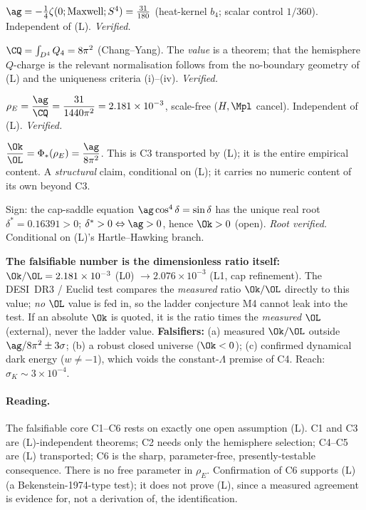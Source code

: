 \begin{description}[leftmargin=2.8em,itemsep=3pt]
\item[C1 {[THM]}]
  $\ag=-\tfrac14\zeta(0;\text{Maxwell};S^4)=\tfrac{31}{180}$ (heat-kernel
  $b_4$; scalar control $1/360$). Independent of (L). \emph{Verified.}
\item[C2 {[THM\,$|$\,H]}]
  $\CQ=\int_{D^4}Q_4=8\pi^2$ (Chang--Yang). The \emph{value} is a theorem;
  that the hemisphere $Q$-charge is the relevant normalisation follows from
  the no-boundary geometry of (L) and the uniqueness criteria (i)--(iv).
  \emph{Verified.}
\item[C3 {[THM]}]
  $\displaystyle \rho_E=\frac{\ag}{\CQ}=\frac{31}{1440\pi^2}=2.181\times10^{-3}$,
  scale-free ($H,\Mpl$ cancel). Independent of (L). \emph{Verified.}
\item[C4 {[STRUCT\,$|$\,(L)]}]
  $\displaystyle \frac{\Ok}{\OL}=\Phi_*(\rho_E)=\frac{\ag}{8\pi^2}$.
  This is C3 transported by (L); it is the entire empirical content. A
  \emph{structural} claim, conditional on (L); it carries no numeric content
  of its own beyond C3.
\item[C5 {[DER\,$|$\,(L), cap saddle]}]
  Sign: the cap-saddle equation $\ag\cos^4\delta=\sin\delta$ has the unique
  real root $\delta^*=0.16391>0$; $\delta^*>0\Leftrightarrow\ag>0$, hence
  $\Ok>0$ (open). \emph{Root verified.} Conditional on (L)'s Hartle--Hawking
  branch.
\item[C6 {[FALS]}]
  \textbf{The falsifiable number is the dimensionless ratio itself:}
  $\Ok/\OL = 2.181\times10^{-3}$ (L0) $\to 2.076\times10^{-3}$ (L1, cap
  refinement). The DESI~DR3 / Euclid test compares the \emph{measured} ratio
  $\Ok/\OL$ directly to this value; \emph{no} $\OL$ value is fed in, so the
  ladder conjecture M4 cannot leak into the test. If an absolute $\Ok$ is
  quoted, it is the ratio times the \emph{measured} $\OL$ (external), never the
  ladder value. \textbf{Falsifiers:} (a) measured $\Ok/\OL$ outside
  $\ag/8\pi^2 \pm 3\sigma$; (b) a robust closed universe ($\Ok<0$); (c)
  confirmed dynamical dark energy ($w\neq-1$), which voids the constant-$\Lambda$
  premise of C4. Reach: $\sigma_K\sim3\times10^{-4}$.
\end{description}

\paragraph{Reading.} The falsifiable core C1--C6 rests on exactly one open
assumption (L). C1 and C3 are (L)-independent theorems; C2 needs only the
hemisphere selection; C4--C5 are (L) transported; C6 is the sharp,
parameter-free, presently-testable consequence. There is no free parameter
in $\rho_E$. Confirmation of C6 supports (L) (a Bekenstein-1974-type test);
it does not prove (L), since a measured agreement is evidence for, not a
derivation of, the identification.

